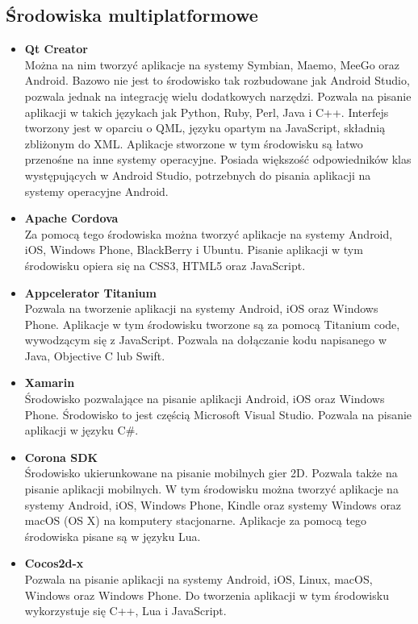 \documentclass[eng]{mgr}
\begin{document}
			\subsection{Środowiska multiplatformowe}
			\begin{itemize}
				\item \textbf{Qt Creator}\\
				Można na nim tworzyć aplikacje na systemy Symbian, Maemo, MeeGo oraz Android. Bazowo nie jest to środowisko tak rozbudowane jak Android Studio, pozwala jednak na integrację wielu dodatkowych narzędzi. Pozwala na pisanie aplikacji w takich językach jak Python, Ruby, Perl, Java i C++. Interfejs tworzony jest w oparciu o QML, języku opartym na JavaScript, składnią zbliżonym do XML. Aplikacje stworzone w tym środowisku są łatwo przenośne na inne systemy operacyjne. Posiada większość odpowiedników klas występujących w Android Studio, potrzebnych do pisania aplikacji na systemy operacyjne Android.
				
				\item \textbf{Apache Cordova}\\
				Za pomocą tego środowiska można tworzyć aplikacje na systemy Android, iOS, Windows Phone, BlackBerry i Ubuntu. Pisanie aplikacji w tym środowisku opiera się na CSS3, HTML5 oraz JavaScript.
				
				\item \textbf{Appcelerator Titanium}\\
				Pozwala na tworzenie aplikacji na systemy Android, iOS oraz Windows Phone. Aplikacje w tym środowisku tworzone są za pomocą Titanium code, wywodzącym się z JavaScript. Pozwala na dołączanie kodu napisanego w Java, Objective C lub Swift.
				
				\item \textbf{Xamarin}\\
				Środowisko pozwalające na pisanie aplikacji Android, iOS oraz Windows Phone. Środowisko to jest częścią Microsoft Visual Studio. Pozwala na pisanie aplikacji w języku C\#.
				
				\item \textbf{Corona SDK}\\
				Środowisko ukierunkowane na pisanie mobilnych gier 2D. Pozwala także na pisanie aplikacji mobilnych. W tym środowisku można tworzyć aplikacje na systemy Android, iOS, Windows Phone, Kindle oraz systemy Windows oraz macOS (OS X) na komputery stacjonarne. Aplikacje za pomocą tego środowiska pisane są w języku Lua.
				
				\item \textbf{Cocos2d-x}\\
				Pozwala na pisanie aplikacji na systemy Android, iOS, Linux, macOS, Windows oraz Windows Phone. Do tworzenia aplikacji w tym środowisku wykorzystuje się C++, Lua i JavaScript.
				

\end{itemize}
\end{document}

